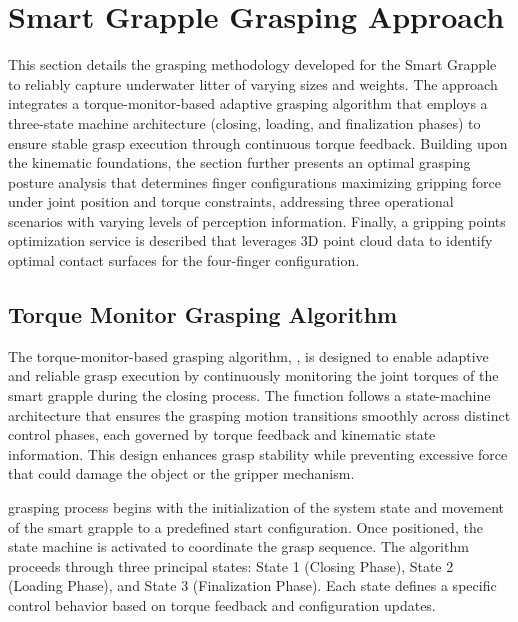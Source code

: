 \documentclass[a4paper,11pt]{article}
\let\oldsection\section
\renewcommand\section{\clearpage\oldsection}
\begin{document}


\section{Smart Grapple Grasping Approach}

This section details the grasping methodology developed for the Smart Grapple to reliably capture underwater litter of varying sizes and weights. The approach integrates a torque-monitor-based adaptive grasping algorithm that employs a three-state machine architecture (closing, loading, and finalization phases) to ensure stable grasp execution through continuous torque feedback. Building upon the kinematic foundations, the section further presents an optimal grasping posture analysis that determines finger configurations maximizing gripping force under joint position and torque constraints, addressing three operational scenarios with varying levels of perception information. Finally, a gripping points optimization service is described that leverages 3D point cloud data to identify optimal contact surfaces for the four-finger configuration.


\subsection{Torque Monitor Grasping Algorithm}
The torque-monitor-based grasping algorithm, , is designed to enable adaptive and reliable grasp execution by continuously monitoring the joint torques of the smart grapple during the closing process. The function follows a state-machine architecture that ensures the grasping motion transitions smoothly across distinct control phases, each governed by torque feedback and kinematic state information. This design enhances grasp stability while preventing excessive force that could damage the object or the gripper mechanism.

 grasping process begins with the initialization of the system state and movement of the smart grapple to a predefined start configuration. Once positioned, the state machine is activated to coordinate the grasp sequence. The algorithm proceeds through three principal states: State 1 (Closing Phase), State 2 (Loading Phase), and State 3 (Finalization Phase). Each state defines a specific control behavior based on torque feedback and configuration updates.
\end{document}
